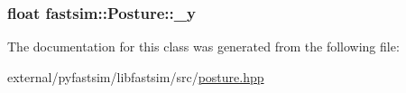 \subsubsection[{\texorpdfstring{\+\_\+y}{_y}}]{\setlength{\rightskip}{0pt plus 5cm}float fastsim\+::\+Posture\+::\+\_\+y\hspace{0.3cm}{\ttfamily [protected]}}\hypertarget{classfastsim_1_1_posture_a147bf9a8c294c750b0a58e7178c35224}{}\label{classfastsim_1_1_posture_a147bf9a8c294c750b0a58e7178c35224}


The documentation for this class was generated from the following file\+:\begin{DoxyCompactItemize}
\item 
external/pyfastsim/libfastsim/src/\hyperlink{posture_8hpp}{posture.\+hpp}\end{DoxyCompactItemize}
